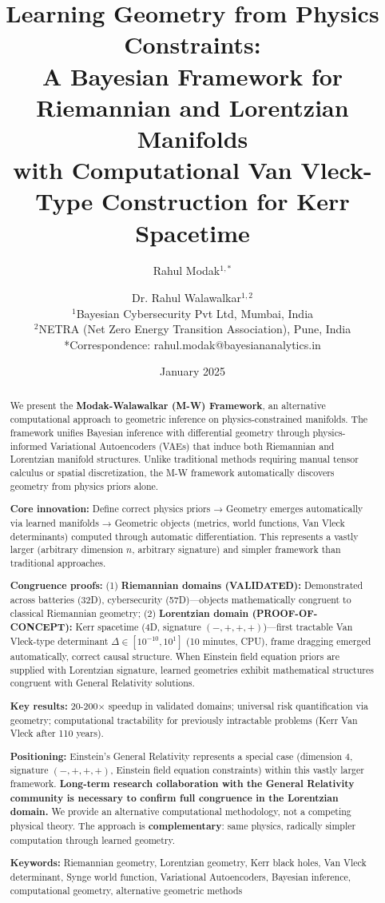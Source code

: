 \documentclass[11pt,a4paper]{article}
\title{\textbf{Learning Geometry from Physics Constraints:\\
A Bayesian Framework for Riemannian and Lorentzian Manifolds}\\
\vspace{0.5cm}
\Large{with Computational Van Vleck-Type Construction for Kerr Spacetime}}
\author{
Rahul Modak$^{1,*}$ \and Dr. Rahul Walawalkar$^{1,2}$\\[0.5cm]
\small{$^1$Bayesian Cybersecurity Pvt Ltd, Mumbai, India}\\
\small{$^2$NETRA (Net Zero Energy Transition Association), Pune, India}\\[0.3cm]
\small{*Correspondence: rahul.modak@bayesiananalytics.in}
}
\date{January 2025}
\begin{document}
\maketitle

\begin{abstract}
\noindent We present the \textbf{Modak-Walawalkar (M-W) Framework}, an alternative computational approach to geometric inference on physics-constrained manifolds. The framework unifies Bayesian inference with differential geometry through physics-informed Variational Autoencoders (VAEs) that induce both Riemannian and Lorentzian manifold structures. Unlike traditional methods requiring manual tensor calculus or spatial discretization, the M-W framework automatically discovers geometry from physics priors alone.

\textbf{Core innovation:} Define correct physics priors → Geometry emerges automatically via learned manifolds → Geometric objects (metrics, world functions, Van Vleck determinants) computed through automatic differentiation. This represents a vastly larger (arbitrary dimension $n$, arbitrary signature) and simpler framework than traditional approaches.

\textbf{Congruence proofs:} (1) \textbf{Riemannian domains (VALIDATED):} Demonstrated across batteries (32D), cybersecurity (57D)—objects mathematically congruent to classical Riemannian geometry; (2) \textbf{Lorentzian domain (PROOF-OF-CONCEPT):} Kerr spacetime (4D, signature $(-,+,+,+)$)—first tractable Van Vleck-type determinant $\Delta \in [10^{-10}, 10^{1}]$ (10 minutes, CPU), frame dragging emerged automatically, correct causal structure. When Einstein field equation priors are supplied with Lorentzian signature, learned geometries exhibit mathematical structures congruent with General Relativity solutions.

\textbf{Key results:} 20-200$\times$ speedup in validated domains; universal risk quantification via geometry; computational tractability for previously intractable problems (Kerr Van Vleck after 110 years).

\textbf{Positioning:} Einstein's General Relativity represents a special case (dimension 4, signature $(-,+,+,+)$, Einstein field equation constraints) within this vastly larger framework. \textbf{Long-term research collaboration with the General Relativity community is necessary to confirm full congruence in the Lorentzian domain.} We provide an alternative computational methodology, not a competing physical theory. The approach is \textbf{complementary}: same physics, radically simpler computation through learned geometry.

\vspace{0.3cm}
\noindent\textbf{Keywords:} Riemannian geometry, Lorentzian geometry, Kerr black holes, Van Vleck determinant, Synge world function, Variational Autoencoders, Bayesian inference, computational geometry, alternative geometric methods
\end{abstract}
\end{document}
